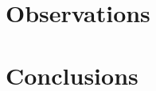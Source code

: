 \documentclass[a4paper,10pt]{article}
\begin{document}
\section{Observations}




\section{Conclusions}
\end{document}
